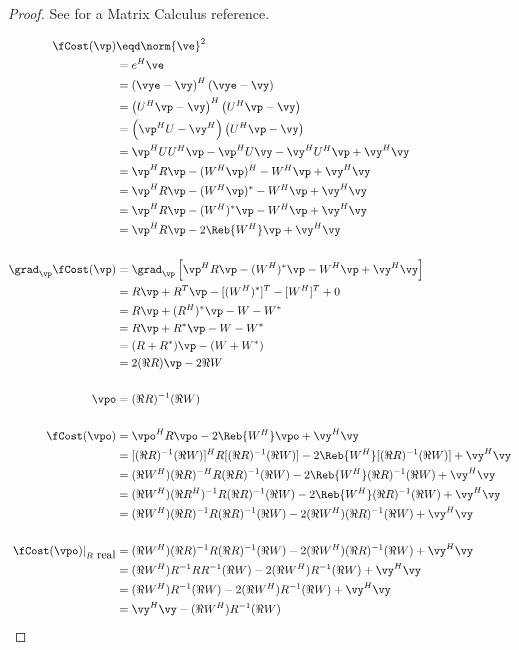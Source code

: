 \begin{proof}
See  for a Matrix Calculus reference.

\begin{align*}
   \fCost(\vp)
     &\eqd \norm{\ve}^2
   \\&=    e^H\ve
   \\&=    \left(\vye-\vy\right)^H\left(\vye-\vy\right)
   \\&=    \left(U^H\vp-\vy\right)^H\left(U^H\vp-\vy\right)
   \\&=    \left(\vp^HU-\vy^H\right)\left(U^H\vp-\vy\right)
   \\&=    \vp^HUU^H\vp - \vp^HU\vy -\vy^HU^H\vp + \vy^H\vy
   \\&=    \vp^H R \vp - (W^H\vp)^H -W^H\vp + \vy^H\vy
   \\&=    \vp^H R \vp - (W^H\vp)^\ast -W^H\vp + \vy^H\vy
   \\&=    \vp^H R \vp - (W^H)^\ast\vp -W^H\vp + \vy^H\vy
   \\&=    \vp^H R \vp - 2\Reb{W^H}\vp + \vy^H\vy
\\
\\
   \grad_\vp \fCost(\vp)
     &= \grad_\vp \left[ \vp^H R \vp - (W^H)^\ast\vp -W^H\vp + \vy^H\vy \right]
   \\&= R\vp + R^T\vp - [(W^H)^\ast]^T - [W^H]^T + 0
   \\&= R\vp + (R^H)^\ast\vp - W - W^\ast
   \\&= R\vp + R^\ast\vp - W - W^\ast
   \\&= (R + R^\ast)\vp - (W + W^\ast)
   \\&= 2(\Re{R})\vp - 2\Re{W}
\\
\\
   \vpo
     &= (\Re{R})^{-1}(\Re{W})
\\
\\
   \fCost(\vpo)
     &=    \vpo^H R \vpo - 2\Reb{W^H}\vpo + \vy^H\vy
   \\&=    [(\Re{R})^{-1}(\Re{W})]^H R [(\Re{R})^{-1}(\Re{W})] - 2\Reb{W^H}[(\Re{R})^{-1}(\Re{W})] + \vy^H\vy
   \\&=    (\Re{W^H})(\Re{R})^{-H} R (\Re{R})^{-1}(\Re{W})     - 2\Reb{W^H}(\Re{R})^{-1}(\Re{W})       + \vy^H\vy
   \\&=    (\Re{W^H})(\Re{R^H})^{-1} R (\Re{R})^{-1}(\Re{W})   - 2\Reb{W^H}(\Re{R})^{-1}(\Re{W})     + \vy^H\vy
   \\&=    (\Re{W^H})(\Re{R})^{-1} R (\Re{R})^{-1}(\Re{W})     - 2(\Re{W^H})(\Re{R})^{-1}(\Re{W})      + \vy^H\vy
\\
\\
   \fCost(\vpo)|_{R\mbox{ real}}
     &=    (\Re{W^H})(\Re{R})^{-1} R (\Re{R})^{-1}(\Re{W}) - 2(\Re{W^H})(\Re{R})^{-1}(\Re{W}) + \vy^H\vy
   \\&=    (\Re{W^H})R^{-1} R R^{-1}(\Re{W}) - 2(\Re{W^H})R^{-1}(\Re{W}) + \vy^H\vy
   \\&=    (\Re{W^H}) R^{-1}(\Re{W}) - 2(\Re{W^H})R^{-1}(\Re{W}) + \vy^H\vy
   \\&=    \vy^H\vy - (\Re{W^H})R^{-1}(\Re{W})
\end{align*}
\end{proof}


